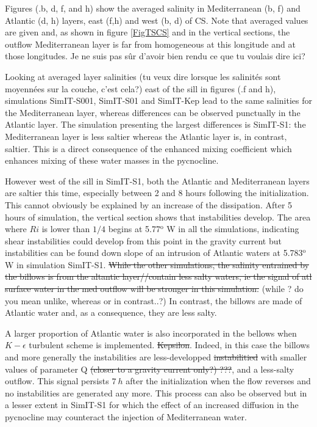 \color{blue}Figures (.b, d, f, and h) show the averaged salinity in Mediterranean (b, f) and Atlantic (d, h) layers, east (f,h) and west (b, d) \color{black} of CS. Note that averaged values are given and, as shown in figure \ref{FigTSCS} and in the vertical sections, the outflow Mediterranean layer is far from homogeneous at this longitude and at those longitudes. \color{black} \color{green}Je ne suis pas sûr d'avoir bien rendu ce que tu voulais dire ici? \color{black}

Looking at averaged layer salinities \color{green}(tu veux dire lorsque les salinités sont moyennées sur la couche, c'est cela?) \color{black} east of the sill in figures (.f and h), simulations SimIT-S001, SimIT-S01 and SimIT-Kep \color{blue} lead to the same salinities for the Mediterranean layer, whereas differences can be observed punctually in the Atlantic layer. The simulation presenting the largest differences is SimIT-S1: the Mediterranean layer is less saltier whereas the Atlantic layer is, in contrast, saltier. This is a direct consequence of the enhanced mixing coefficient which enhances mixing of these water masses in the pycnocline. \color{black}

\color{blue}However west of the sill in SimIT-S1, both the Atlantic and Mediterranean layers are saltier this time, especially between 2 and 8 hours following the initialization. This cannot obviously be explained by an increase of the dissipation.\color{black} After 5 hours of simulation, the vertical section shows that instabilities develop.  \color{blue}The area where $Ri$ is lower than $1/4$ begins at 5.77$^\text{o}$ W in all the simulations, indicating shear instabilities could develop from this point in the gravity current but instabilities can be found down slope of an intrusion of Atlantic waters at 5.783$^\text{o}$ W in simulation SimIT-S1. \color{black}
\sout{While the other simulations, the salinity entrained by the billows is from the altantic layer//contain less salty waters, ie the signal of atl surface water in the med outflow will be stronger in this simulation.} \color{green}(while ? do you mean unlike, whereas or in contrast..?) \color{black}
 \color{blue}In contrast, the billows are made of Atlantic water and, as a consequence, they are less salty. \color{black}
 
\color{blue}A larger proportion of Atlantic water is also incorporated in the bellows when $K-\epsilon$ turbulent scheme is implemented. \sout{Kepsilon}. Indeed, in this case the billows and more generally the instabilities are less-developped \sout{instabilitied} with smaller values of parameter Q  \sout{(closer to a gravity current only?) ???}, and a less-salty outflow. This signal persists \color{blue}$7\ h$ after the initialization when the flow reverses and no instabilities are generated any more. This process can also be observed but in a lesser extent in SimIT-S1 for which the effect of an increased diffusion in the pycnocline may counteract the injection of Mediterranean water. \color{black}

